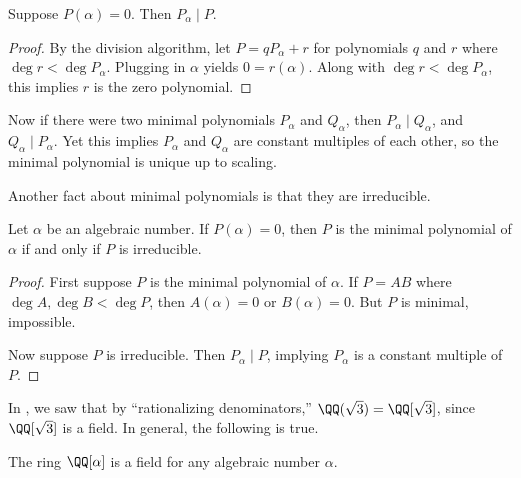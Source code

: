 \documentclass[11pt]{scrartcl}
\begin{document}
\begin{lemma}
	Suppose $P(\alpha) = 0$. Then $P_\alpha \mid P$.
\end{lemma}

\begin{proof}
	By the division algorithm, let $P = qP_\alpha + r$ for polynomials $q$ and $r$
	where $\deg r < \deg P_\alpha$. Plugging in $\alpha$ yields $0 = r(\alpha)$.
	Along with $\deg r < \deg P_\alpha$, this implies $r$ is the zero polynomial.
\end{proof}

Now if there were two minimal polynomials $P_\alpha$ and $Q_\alpha$, then $P_\alpha \mid Q_\alpha$, and $Q_\alpha \mid P_\alpha$. Yet this implies $P_\alpha$ and $Q_\alpha$ are constant multiples of each other, so the minimal polynomial is unique up to scaling.

Another fact about minimal polynomials is that they are irreducible.
\begin{theorem}
	Let $\alpha$ be an algebraic number. If $P(\alpha) = 0$, then $P$ is the minimal polynomial of $\alpha$ if and only if $P$ is irreducible.
\end{theorem}

\begin{proof}
	First suppose $P$ is the minimal polynomial of $\alpha$.
	If $P = AB$ where $\deg A,\deg B < \deg P$, then
	$A(\alpha) = 0$ or $B(\alpha) = 0$. But $P$ is minimal, impossible.

	Now suppose $P$ is irreducible. Then $P_\alpha \mid P$, implying $P_\alpha$ is a constant multiple of $P$.
\end{proof}

In , we saw that by ``rationalizing denominators,''
$\QQ(\sqrt3) = \QQ[\sqrt3]$, since $\QQ[\sqrt3]$ is a field.
In general, the following is true.
\begin{theorem}
	The ring $\QQ[\alpha]$ is a field for any algebraic number $\alpha$.
\end{theorem}
\end{document}
